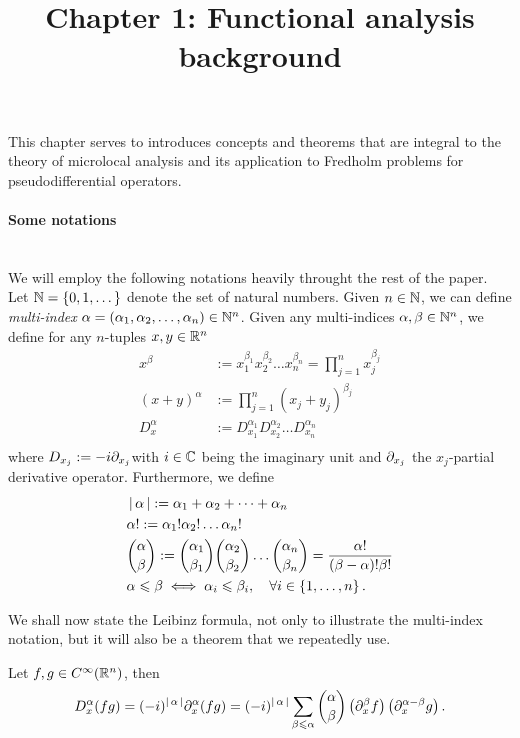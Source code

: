 \documentclass[12pt]{article}
\title{Chapter 1: Functional analysis background}
\date{}
\begin{document}
\maketitle

This chapter serves to introduces concepts and theorems that are integral to the theory of microlocal analysis and its application to Fredholm problems for pseudodifferential operators. 

\paragraph{Some notations} \hfill \\
We will employ the following notations heavily throught the rest of the paper. Let ${\mathbb N} = \left\{0, 1, \dots\right\}$ denote the set of natural numbers. Given $n \in {\ensuremath {\mathbb N}}$, we can define \textit{multi-index} $\alpha = (\alpha_1, \alpha_2, \dots, \alpha_n) \in {\ensuremath {\mathbb N}}^n$. Given any multi-indices $\alpha, \beta \in {\ensuremath {\mathbb N}}^n$, we define for any $n$-tuples $x, y \in {\ensuremath {\mathbb R}}^n$ 
\begin{align*}
x^\beta &:= x_1^{\beta_1} x_2^{\beta_2}\dots x_n^{\beta_n} = \prod_{j = 1}^n x_j^{\beta_j}\\
 (x + y)^\alpha &:= \prod_{j = 1}^n (x_j + y_j)^{\beta_j} \\
D^\alpha_x &:= D_{x_1}^{\alpha_1} D_{x_2}^{\alpha_2} \dots D_{x_n}^{\alpha_n}\\
\end{align*}
where $D_{x_j} := - i \partial_{x_j}$with $i \in {\ensuremath {\mathbb C}}$ being the imaginary unit and $\partial_{x_j} $ the $x_j$-partial derivative operator. Furthermore, we define
\begin{align*}
&\left|\, \alpha\,\right| := \alpha_1 + \alpha_2 + \dots + \alpha_n\\
& \alpha! := \alpha_1! \alpha_2! \dots \alpha_n! \\
& \binom{\alpha}{\beta} := \binom{\alpha_1}{\beta_1} \binom{\alpha_2}{ \beta_2} \dots \binom{\alpha_n}{\beta_n} = \frac{\alpha!}{(\beta - \alpha)! \beta!} \\
&\alpha \leqslant \beta \iff \alpha_i \leqslant \beta_i, \quad \forall i \in \left\{1, \dots, n\right\}. 
\end{align*}

We shall now state the Leibinz formula, not only to illustrate the multi-index notation, but it will also be a theorem that we repeatedly use. 
\begin{ftheorem}
    Let $f, g \in C^\infty({\mathbb R}^n)$, then 
    \begin{align*}
    D^\alpha_x (fg) = (-i)^{\left|\, \alpha\,\right|} \partial_x^\alpha(fg) = (-i)^{\left|\, \alpha\,\right|} \sum_{\beta \leqslant \alpha} \binom{\alpha}{\beta}  \left(\partial_x^\beta f\right) \left(\partial_x^{\alpha - \beta}g\right). 
    \end{align*}
\end{ftheorem}
\end{document}
